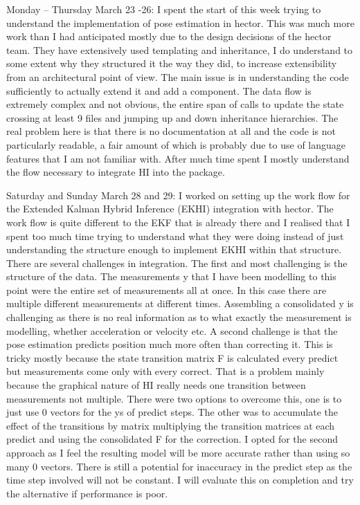 \documentclass[]{../resources/final_report}
\begin{document}
\begin{appendices}
  Monday – Thursday March 23 -26: I spent the start of this week trying to understand the implementation of pose estimation in hector. This was much more work than I had anticipated mostly due to the design decisions of the hector team. They have extensively used templating and inheritance, I do understand to some extent why they structured it the way they did, to increase extensibility from an architectural point of view. The main issue is in understanding the code sufficiently to actually extend it and add a component. The data flow is extremely complex and not obvious, the entire span of calls to update the state crossing at least 9 files and jumping up and down inheritance hierarchies. The real problem here is that there is no documentation at all and the code is not particularly readable, a fair amount of which is probably due to use of language features that I am not familiar with. After much time spent I mostly understand the flow necessary to integrate HI into the package.

  Saturday and Sunday March 28 and 29: I worked on setting up the work flow for the Extended Kalman Hybrid Inference (EKHI) integration with hector. The work flow is quite different to the EKF that is already there and I realised that I spent too much time trying to understand what they were doing instead of just understanding the structure enough to implement EKHI within that structure. There are several challenges in integration. The first and most challenging is the structure of the data. The measurements y that I have been modelling to this point were the entire set of measurements all at once. In this case there are multiple different measurements at different times. Assembling a consolidated y is challenging as there is no real information as to what exactly the measurement is modelling, whether acceleration or velocity etc. A second challenge is that the pose estimation predicts position much more often than correcting it. This is tricky mostly because the state transition matrix F is calculated every predict but measurements come only with every correct. That is a problem mainly because the graphical nature of HI really needs one transition between measurements not multiple. There were two options to overcome this, one is to just use 0 vectors for the ys of predict steps. The other was to accumulate the effect of the transitions by matrix multiplying the transition matrices at each predict and using the consolidated F for the correction. I opted for the second approach as I feel the resulting model will be more accurate rather than using so many 0 vectors. There is still a potential for inaccuracy in the predict step as the time step involved will not be constant. I will evaluate this on completion and try the alternative if performance is poor.


\end{appendices}
\end{document}
